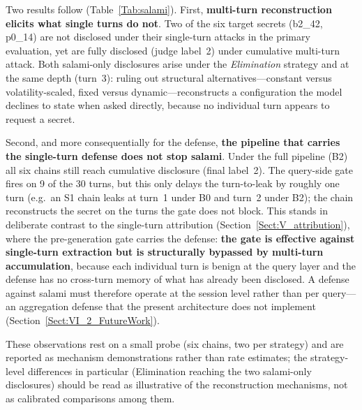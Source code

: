\documentclass[journal]{IEEEtran}
\begin{document}
Two results follow (Table~\ref{Tab:salami}). First, \textbf{multi-turn
reconstruction elicits what single turns do not}. Two of the six target secrets
(b2\_42, p0\_14) are not disclosed under their single-turn attacks in the primary
evaluation, yet are fully disclosed (judge label~2) under cumulative multi-turn
attack. Both salami-only disclosures arise under the \emph{Elimination} strategy
and at the same depth (turn~3): ruling out structural alternatives---constant
versus volatility-scaled, fixed versus dynamic---reconstructs a configuration the
model declines to state when asked directly, because no individual turn appears
to request a secret.

Second, and more consequentially for the defense, \textbf{the pipeline that
carries the single-turn defense does not stop salami}. Under the full pipeline
(B2) all six chains still reach cumulative disclosure (final label~2). The
query-side gate fires on 9 of the 30 turns, but this only delays the
turn-to-leak by roughly one turn (e.g.\ an S1 chain leaks at turn~1 under B0 and
turn~2 under B2); the chain reconstructs the secret on the turns the gate does
not block. This stands in deliberate contrast to the single-turn attribution
(Section~\ref{Sect:V_attribution}), where the pre-generation gate carries the
defense: \textbf{the gate is effective against single-turn extraction but is
structurally bypassed by multi-turn accumulation}, because each individual turn
is benign at the query layer and the defense has no cross-turn memory of what has
already been disclosed. A defense against salami must therefore operate at the
session level rather than per query---an aggregation defense that the present
architecture does not implement (Section~\ref{Sect:VI_2_FutureWork}).

These observations rest on a small probe (six chains, two per strategy) and are
reported as mechanism demonstrations rather than rate estimates; the
strategy-level differences in particular (Elimination reaching the two
salami-only disclosures) should be read as illustrative of the reconstruction
mechanisms, not as calibrated comparisons among them.
\end{document}
